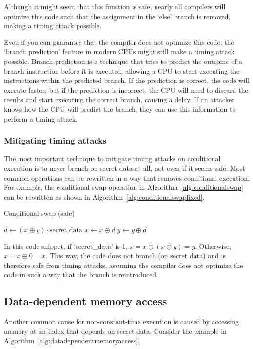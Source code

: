 \documentclass[11pt,a4paper]{report}
\theoremstyle{definition}
\begin{document}
Although it might seem that this function is safe, nearly all compilers will optimize this code such that the assignment in the `else' branch is removed, making a timing attack possible.

Even if you can guarantee that the compiler does not optimize this code, the `branch prediction' feature in modern CPUs might still make a timing attack possible. Branch prediction is a technique that tries to predict the outcome of a branch instruction before it is executed, allowing a CPU to start executing the instructions within the predicted branch. If the prediction is correct, the code will execute faster, but if the prediction is incorrect, the CPU will need to discard the results and start executing the correct branch, causing a delay. If an attacker knows how the CPU will predict the branch, they can use this information to perform a timing attack.

\subsubsection{Mitigating timing attacks}
The most important technique to mitigate timing attacks on conditional execution is to never branch on secret data at all, not even if it seems safe. Most common operations can be rewritten in a way that removes conditional execution. For example, the conditional swap operation in Algorithm~\ref{alg:conditionalswap} can be rewritten as shown in Algorithm~\ref{alg:conditionalswapfixed}.

\begin{algorithm}
  \caption{Conditional swap (safe)}
  \label{alg:conditionalswapfixed}
  \begin{algorithmic}[1]
    \State $d \gets (x \oplus y) \cdot \text{secret\_data}$ 
    \State $x \gets x \oplus d$
    \State $y \gets y \oplus d$
    \EndFunction
  \end{algorithmic}
\end{algorithm}

In this code snippet, if `secret\_data' is 1, $x = x \oplus (x \oplus y) = y$. Otherwise, $x = x \oplus 0 = x$. This way, the code does not branch (on secret data) and is therefore safe from timing attacks, assuming the compiler does not optimize the code in such a way that the branch is reintroduced.

\subsection{Data-dependent memory access}
\label{sec:datadependentmemoryaccess}
Another common cause for non-constant-time execution is caused by accessing memory at an index that depends on secret data. Consider the example in Algorithm~\ref{alg:datadependentmemoryaccess}.
\end{document}
